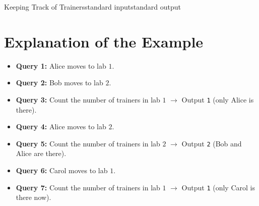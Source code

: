\begin{problem}{Keeping Track of Trainers}{standard input}{standard output}
    \section*{Explanation of the Example}
    \begin{itemize}
        \item \textbf{Query 1:} Alice moves to lab $1$.
        \item \textbf{Query 2:} Bob moves to lab $2$.
        \item \textbf{Query 3:} Count the number of trainers in lab $1$ $\to$ Output \texttt{1} (only Alice is there).
        \item \textbf{Query 4:} Alice moves to lab $2$.
        \item \textbf{Query 5:} Count the number of trainers in lab $2$ $\to$ Output \texttt{2} (Bob and Alice are there).
        \item \textbf{Query 6:} Carol moves to lab $1$.
        \item \textbf{Query 7:} Count the number of trainers in lab $1$ $\to$ Output \texttt{1} (only Carol is there now).
    \end{itemize}
    \end{problem}
    